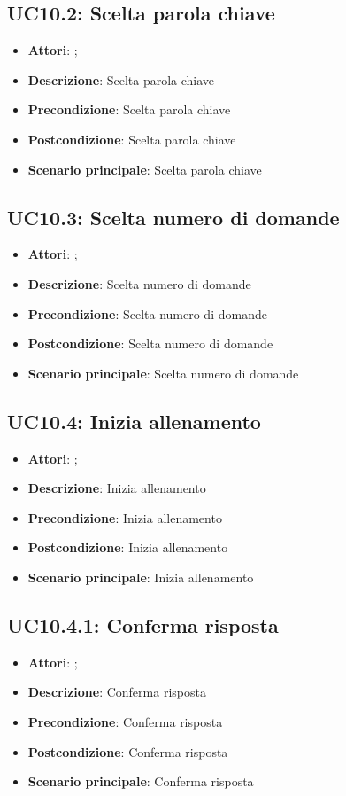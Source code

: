 \subsection{UC10.2: Scelta parola chiave}
\label{UC10.2}
\begin{itemize}
\item \textbf{Attori}: ;
\item \textbf{Descrizione}: Scelta parola chiave
\item \textbf{Precondizione}: Scelta parola chiave
\item \textbf{Postcondizione}: Scelta parola chiave
\item \textbf{Scenario principale}:
Scelta parola chiave
\end{itemize}

\subsection{UC10.3: Scelta numero di domande}
\label{UC10.3}
\begin{itemize}
\item \textbf{Attori}: ;
\item \textbf{Descrizione}: Scelta numero di domande
\item \textbf{Precondizione}: Scelta numero di domande
\item \textbf{Postcondizione}: Scelta numero di domande
\item \textbf{Scenario principale}:
Scelta numero di domande
\end{itemize}

\subsection{UC10.4: Inizia allenamento}
\label{UC10.4}
\begin{itemize}
\item \textbf{Attori}: ;
\item \textbf{Descrizione}: Inizia allenamento
\item \textbf{Precondizione}: Inizia allenamento
\item \textbf{Postcondizione}: Inizia allenamento
\item \textbf{Scenario principale}:
Inizia allenamento
\end{itemize}

\subsection{UC10.4.1: Conferma risposta}
\label{UC10.4.1}
\begin{itemize}
\item \textbf{Attori}: ;
\item \textbf{Descrizione}: Conferma risposta
\item \textbf{Precondizione}: Conferma risposta
\item \textbf{Postcondizione}: Conferma risposta
\item \textbf{Scenario principale}:
Conferma risposta
\end{itemize}

